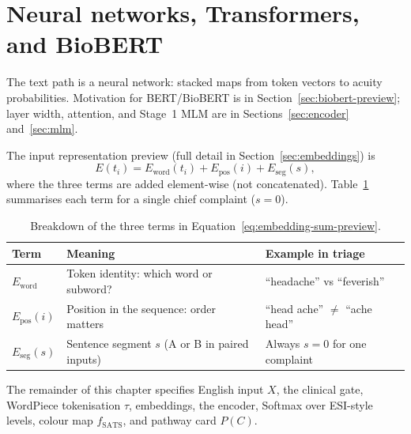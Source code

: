 \section{Neural networks, Transformers, and BioBERT}
\label{sec:nn-transformer-primer}
\label{sec:bert-bridge}
\label{sec:biobert-bridge}

The text path is a neural network: stacked maps from token vectors to acuity probabilities. Motivation for BERT/BioBERT is in Section~\ref{sec:biobert-preview}; layer width, attention, and Stage~1 MLM are in Sections~\ref{sec:encoder} and~\ref{sec:mlm}.

The input representation preview (full detail in Section~\ref{sec:embeddings}) is
\begin{equation}
  E(t_i) = E_{\mathrm{word}}(t_i) + E_{\mathrm{pos}}(i) + E_{\mathrm{seg}}(s),
  \label{eq:embedding-sum-preview}
\end{equation}
where the three terms are added element-wise (not concatenated). Table~\ref{tab:embedding-breakdown} summarises each term for a single chief complaint (\(s=0\)).

\begin{table}[H]
\centering
\small
\begin{tabular}{|p{2cm}|p{4.5cm}|p{4.8cm}|}
\hline
\textbf{Term} & \textbf{Meaning} & \textbf{Example in triage} \\
\hline
\(E_{\mathrm{word}}\) & Token identity: which word or subword? & ``headache'' vs ``feverish'' \\
\(E_{\mathrm{pos}}(i)\) & Position in the sequence: order matters & ``head ache'' \(\neq\) ``ache head'' \\
\(E_{\mathrm{seg}}(s)\) & Sentence segment \(s\) (A or B in paired inputs) & Always \(s=0\) for one complaint \\
\hline
\end{tabular}
\caption{Breakdown of the three terms in Equation~\eqref{eq:embedding-sum-preview}.}
\label{tab:embedding-breakdown}
\end{table}

The remainder of this chapter specifies English input \(X\), the clinical gate, WordPiece tokenisation \(\tau\), embeddings, the encoder, Softmax over ESI-style levels, colour map \(f_{\mathrm{SATS}}\), and pathway card \(P(C)\).
